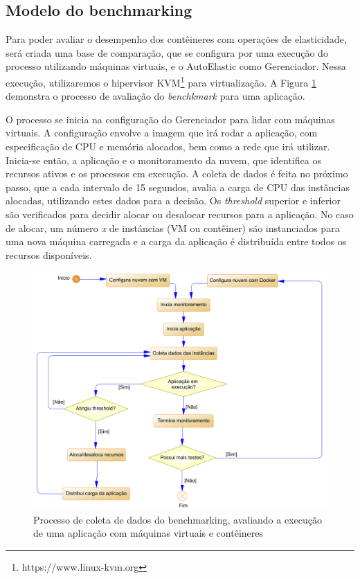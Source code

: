 \documentclass[twoside,english,brazilian]{UNISINOSartigo}
\begin{document}
\subsection{Modelo do benchmarking}

Para poder avaliar o desempenho dos contêineres com operações de elasticidade, será criada uma base de comparação, que se configura por uma execução do processo utilizando máquinas virtuais, e o AutoElastic como Gerenciador. Nessa execução, utilizaremos o hipervisor KVM\footnote{https://www.linux-kvm.org} para virtualização. A Figura \ref{fig:flow} demonstra o processo de avaliação do \textit{benchkmark} para uma aplicação.

O processo se inicia na configuração do Gerenciador para lidar com máquinas virtuais. A configuração envolve a imagem que irá rodar a aplicação, com especificação de CPU e memória alocados, bem como a rede que irá utilizar. Inicia-se então, a aplicação e o monitoramento da nuvem, que identifica os recursos ativos e os processos em execução. A coleta de dados é feita no próximo passo, que a cada intervalo de 15 segundos, avalia a carga de CPU das instâncias alocadas, utilizando estes dados para a decisão. Os \textit{threshold} superior e inferior são verificados para decidir alocar ou desalocar recursos para a aplicação. No caso de alocar, um número \textit{x} de instâncias (VM ou contêiner) são instanciados para uma nova máquina carregada e a carga da aplicação é distribuída entre todos os recursos disponíveis.

\begin{figure}[ht!]
	\caption{Processo de coleta de dados do benchmarking, avaliando a execução de uma aplicação com máquinas virtuais e contêineres}
	\label{fig:flow}
	\centering%
	\vspace{-0.75\baselineskip}
	\begin{minipage}{0.9\textwidth}
		\includegraphics[width=\textwidth]{images/flow_modelo}
	\end{minipage}
\end{figure}
\end{document}
